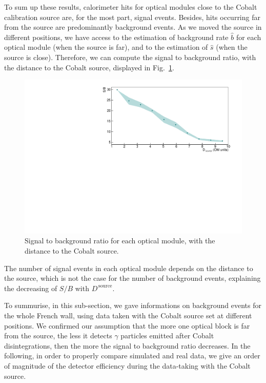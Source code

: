 To sum up these results, calorimeter hits for optical modules close to the Cobalt calibration source are, for the most part, signal events.
Besides, hits occurring far from the source are predominantly background events.
As we moved the source in different positions, we have access to the estimation of background rate $\hat{b}$ for each optical module (when the source is far), and to the estimation of $\hat{s}$ (when the source is close).
Therefore, we can compute the signal to background ratio, with the distance to the Cobalt source, displayed in Fig.~\ref{fig:Co_ratioSB}.
\begin{figure}[h]
  \centering
  \includegraphics[width=1.1\textwidth]{commissioning/fig_commissioning/Co_ratioSB_distance.pdf}
  \caption{Signal to background ratio for each optical module, with the distance to the Cobalt source.
    \label{fig:Co_ratioSB}}
\end{figure}
The number of signal events in each optical module depends on the distance to the source, which is not the case for the number of background events, explaining the decreasing of $S/B$ with $D^{\,\text{source}}$.

To summurise, in this sub-section, we gave informations on background events for the whole French wall, using data taken with the Cobalt source set at different positions.
We confirmed our assumption that the more one optical block is far from the source, the less it detects $\gamma$ particles emitted after Cobalt disintegrations, then the more the signal to background ratio decreases.
In the following, in order to properly compare simulated and real data, we give an order of magnitude of the detector efficiency during the data-taking with the Cobalt source.

